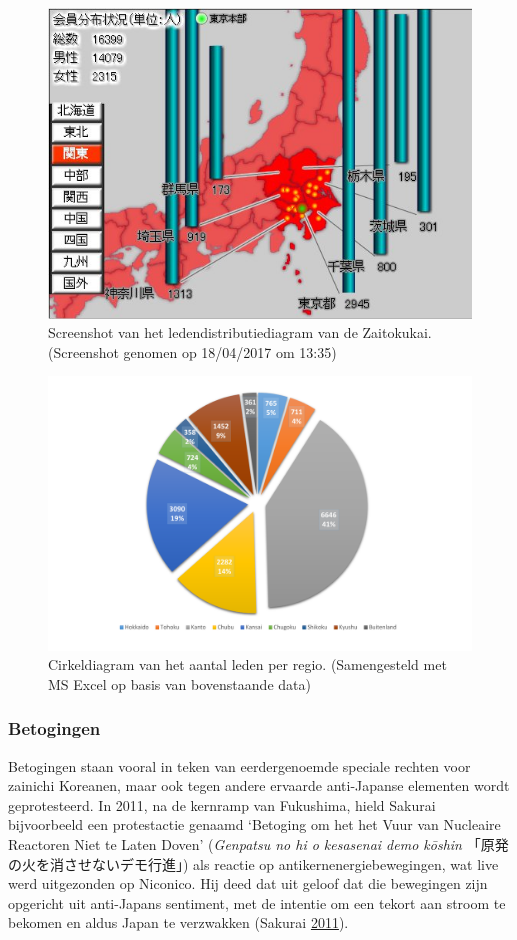 \documentclass[10.5pt,dutch,]{article}
\begin{document}
\begin{figure}[!htb]
  \centering
    \includegraphics[width=.8\textwidth]{images/zaitokukai_user_base.jpg}
    \caption{Screenshot van het ledendistributiediagram van de Zaitokukai. (Screenshot genomen op 18/04/2017 om 13:35)}
\end{figure}

\begin{figure}[!htb]
  \centering
    \includegraphics[width=.8\textwidth]{images/Zaitokukai_members.pdf}
    \caption{Cirkeldiagram van het aantal leden per regio. (Samengesteld met MS Excel op basis van bovenstaande data)}
\end{figure}

\subsubsection{Betogingen}\label{betogingen}

Betogingen staan vooral in teken van eerdergenoemde speciale rechten
voor zainichi Koreanen, maar ook tegen andere ervaarde anti-Japanse
elementen wordt geprotesteerd. In 2011, na de kernramp van Fukushima,
hield Sakurai bijvoorbeeld een protestactie genaamd `Betoging om het het
Vuur van Nucleaire Reactoren Niet te Laten Doven' (\emph{Genpatsu no hi
o kesasenai demo kōshin} 「原発の火を消させないデモ行進」) als reactie
op antikernenergiebewegingen, wat live werd uitgezonden op Niconico. Hij
deed dat uit geloof dat die bewegingen zijn opgericht uit anti-Japans
sentiment, met de intentie om een tekort aan stroom te bekomen en aldus
Japan te verzwakken (Sakurai
\protect\hyperlink{ref-sakuraiux5fnihonux5f2011}{2011}).
\end{document}
